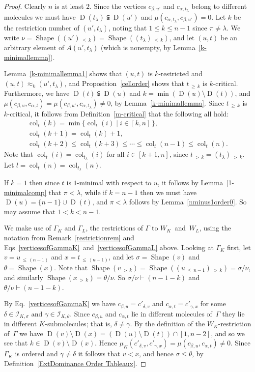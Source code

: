 \documentclass[10pt]{amsart}
\theoremstyle{definition}
\DeclareMathOperator{\col}{col}
\newcommand{\morethan}[2]{#1\,{_{>\,#2}}}
\newcommand{\Lessthan}[2]{#1\,{_{\leqslant\,#2}}}
\newcommand{\Morethan}[2]{#1\,{_{\geqslant\,#2}}}
\DeclareMathOperator{\shape}{Shape}
\DeclareMathOperator{\D}{D}
\begin{document}
\begin{proof}
Clearly $n$ is at least $2$. Since the vertices $c_{\beta,u'}$ and $c_{\alpha,t_\lambda}$
belong to different molecules we must have $\D(t_\lambda)\subsetneqq\D(u')$
and $\mu(c_{\alpha,t_\lambda},c_{\beta,u'})=0$. Let $k$ be the restriction number of
$(u',t_\lambda)$, noting that $1\leqslant k\leqslant n-1$ since $\pi\ne\lambda$.
We write $\nu=\shape(\Lessthan{(u')}k) = \shape(\Lessthan{(t_\lambda)}k)$, and
let $(u,t)$ be an arbitrary element of $A(u',t_\lambda)$ (which is nonempty,
by Lemma~\ref{k-minimallemma}).

Lemma~\ref{k-minimallemma1} shows that $(u,t)$ is $k$-restricted
and $(u,t)\approx_k (u',t_\lambda)$, and Proposition~\ref{cellorder}
shows that $\Morethan{t}{k}$ is $k$-critical.
Furthermore, we have $\D(t)\subsetneqq\D(u)$ and $k=\min(\D(u)\setminus\D(t))$, and
$\mu(c_{\beta,u},c_{\alpha,t})=\mu(c_{\beta,u'},c_{\alpha,t_\lambda})\neq 0$,
by Lemma~\ref{k-minimallemma}.
Since $\Morethan tk$ is~$k$-critical, it follows from Definition~\ref{m-critical}
that the following all hold:
\begin{gather}
\col_t(k)=\min\{\col_t(i)\mid i\in[k,n]\,\},\label{kfirst}\\
\col_t(k+1)=\col_t(k)+1,\label{colk+1}\\
\col_t(k+2)\leqslant\col_t(k+3)\leqslant\cdots\leqslant\col_t(n-1)\leqslant\col_t(n).
\label{incseq}
\end{gather}
Note that $\col_t(i)=\col_{t_\lambda}(i)$ for all $i\in[k+1,n]$, since
$\morethan tk=\morethan{(t_\lambda)}k$. Let $l=\col_t(n)=\col_{t_\lambda}(n)$.

If $k=1$ then since $t$ is $1$-minimal with respect to $u$, it follows
by Lemma~\ref{1-minimalcomp} that $\pi<\lambda$, while if $k=n-1$ then we must have
$\D(u)=\{n-1\}\cup\D(t)$, and $\pi<\lambda$ follows by Lemma~\ref{nminus1order0}.
So may assume that $1<k<n-1$.

We make use of $\Gamma_K$ and $\Gamma_L$, the restrictions of
$\Gamma$ to $W_K$~and~$W_L$, using the notation from Remark~\ref{restrictionrem}
and Eqs~\eqref{verticesofGammaK}~and~\eqref{verticesofGammaL} above.
Looking at $\Gamma_K$ first, let $v=\Lessthan u{(n-1)}$ and
$x=\Lessthan t{(n-1)}$, and let $\sigma=\shape(v)$ and $\theta=\shape(x)$.
Note that $\shape(\morethan vk)=\shape(\morethan{(\Lessthan u{n-1})}k)=\sigma/\nu$,
and similarly $\shape(\morethan xk)=\theta/\nu$.
So $\sigma/\nu\vdash (n-1-k)$ and $\theta/\nu\vdash (n-1-k)$.

By Eq.~\eqref{verticesofGammaK} we have $c_{\beta,u}=c'_{\delta,v}$ and
$c_{\alpha,t}=c'_{\gamma,x}$ for some $\delta\in\mathcal{I}_{K,\sigma}$ and
$\gamma\in\mathcal{I}_{K,\theta}$. Since $c_{\beta,u}$ and $c_{\alpha,t}$
lie in different molecules of~$\Gamma$ they lie in different
$K$-submolecules; that is, $\delta\ne\gamma$.
By the definition of the $W_K$-restriction of~$\Gamma$ we
have $\D(v)\setminus\D(x)=(\D(u)\setminus\D(t))\cap[1,n-2]$, and
so we see that $k\in\D(v)\setminus\D(x)$. Hence
$\mu_K(c'_{\delta,v},c'_{\gamma,x})=\mu(c_{\beta,u},c_{\alpha,t})\neq 0$.
Since $\Gamma_K$ is ordered and $\gamma\neq\delta$
it follows that $v<x$, and hence $\sigma\leqslant\theta$,
by Definition~\ref{ExtDominance Order Tableaux}.


\end{proof}
\end{document}
